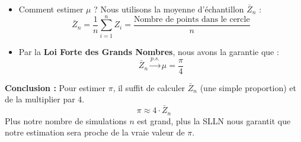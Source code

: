 \begin{examplebox}
\begin{itemize}
    \item Comment estimer $\mu$ ? Nous utilisons la moyenne d'échantillon $\bar{Z}_n$ :
    $$\bar{Z}_n = \frac{1}{n} \sum_{i=1}^n Z_i = \frac{\text{Nombre de points dans le cercle}}{n}$$
    
    \item Par la \textbf{Loi Forte des Grands Nombres}, nous avons la garantie que :
    $$\bar{Z}_n \xrightarrow{p.s.} \mu = \frac{\pi}{4}$$
\end{itemize}

\textbf{Conclusion :}
Pour estimer $\pi$, il suffit de calculer $\bar{Z}_n$ (une simple proportion) et de la multiplier par 4.
$$\pi \approx 4 \cdot \bar{Z}_n$$
Plus notre nombre de simulations $n$ est grand, plus la SLLN nous garantit que notre estimation sera proche de la vraie valeur de $\pi$.
\end{examplebox}